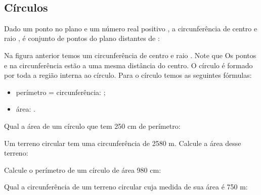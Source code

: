 \documentclass[twocolumn,oneside,a4paper,11pt]{article}
\begin{document}
\

\subsection*{Círculos}

Dado um ponto  no plano e um número real positivo , a circunferência de centro  e raio , é conjunto de pontos do plano distantes  de : 

\noindent Na figura anterior temos um circunferência de centro  e raio . Note que Os pontos  e  na circunferência estão a uma mesma distância  do centro. O círculo é formado por toda a região interna ao círculo. Para o círculo temos as seguintes fórmulas:
\begin{itemize}
\item perímetro = circunferência: ;
\item área: .
\end{itemize}

\begin{exemplo}
Qual a área de um círculo que tem 250 cm de perímetro:
\end{exemplo}

\begin{exemplo}
Um terreno circular tem uma circunferência de 2580 m. Calcule a área desse terreno:
\end{exemplo}

\begin{exemplo}
Calcule o perímetro de um círculo de área 980 cm:
\end{exemplo}

\begin{exemplo}
Qual a circunferência de um terreno circular cuja medida de sua área é 750 m:
\end{exemplo}

\newpage
\end{document}
